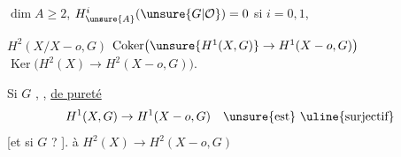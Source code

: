 \uline{ $\dim A\geq 2$},  $H^i_{\unsure{A}}(\unsure{G|\mathcal O})=0$ si $i=0,1$,

 $H^2(X/X-o,G)$  $\operatorname{Coker}\bigl(\unsure{H^1(X,G)}\to H^1(X-o,G)\bigr)$  $\operatorname{Ker}\bigl(H^2(X)\to H^2(X-o,G)\bigr)$.

Si $G$ , ,  \uline{de pureté}
\[
H^1(X,G)\to H^1(X-o,G)\quad\text{\unsure{est} \uline{surjectif}}
\]
[et si $G$  ? \unsure{\ldots}].  à $H^2(X)\to H^2(X-o,G)$
